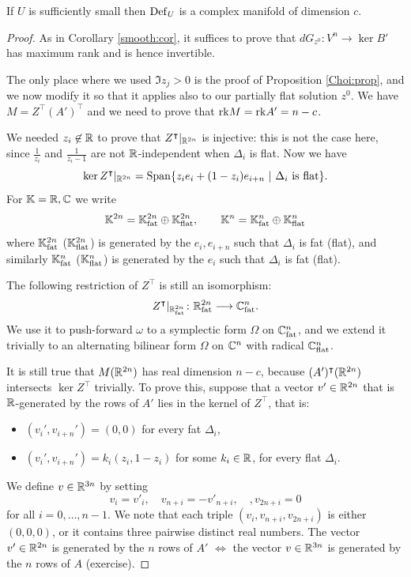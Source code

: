 \begin{prop} \label{smooth:flat:prop}
If $U$ is sufficiently small then ${\rm Def}_U$ is a complex manifold of dimension $c$.
\end{prop}
\begin{proof}
As in Corollary \ref{smooth:cor}, it suffices to prove that $dG_{z^0}\colon V^n \to \ker B'$ has maximum rank and is hence invertible.

The only place where we used $\Im z_j >0$ is the proof of Proposition \ref{Choi:prop}, and we now modify it so that it applies also to our partially flat solution $z^0$. We have $M = Z^\intercal (A')^\intercal$ and we need to prove that ${\rm rk} M = {\rm rk} A' = n-c$.

We needed $z_i \not \in \mathbb{R}$ to prove that $Z^\intercal|_{\mathbb{R}^{2n}}$ is injective: this is not the case here, since $\frac 1{z_i}$ and $\frac 1{z_i-1}$ are not $\mathbb{R}$-independent when $\Delta_i$ is flat. Now we have
$$\ker Z^\intercal |_{\matR^{2n}} = \Span \{ z_ie_i +(1-z_i)e_{i+n}\ | \ \Delta_i\ {\rm is\ flat} \}.$$
For $\mathbb{K}=\mathbb{R}, \mathbb{C}$ we write 
$$\mathbb{K}^{2n} = \mathbb{K}^{2n}_{\rm fat} \oplus \mathbb{K}^{2n}_{\rm flat}, \qquad \mathbb{K}^n = \mathbb{K}^n_{\rm fat} \oplus \mathbb{K}^n_{\rm flat}$$
where $\mathbb{K}^{2n}_{\rm fat}$ ($\mathbb{K}^{2n}_{\rm flat}$) is generated by the $e_i, e_{i+n}$ such that $\Delta_i$ is fat (flat), and similarly $\mathbb{K}^{n}_{\rm fat}$ ($\mathbb{K}^{n}_{\rm flat}$) is generated by the $e_i$ such that $\Delta_i$ is fat (flat).

The following restriction of $Z^\intercal$ is still an isomorphism:
$$Z^\intercal|_{\mathbb{R}^{2n}_{\rm fat}}\colon \mathbb{R}^{2n}_{\rm fat}
\longrightarrow \mathbb{C}^n_{\rm fat}.$$
We use it to push-forward $\omega$ to a symplectic form $\Omega$ on $\mathbb{C}^n_{\rm fat}$, and we extend it trivially to an alternating bilinear form $\Omega$ on $\mathbb{C}^n$ with radical $\mathbb{C}^n_{\rm flat}$.

It is still true that $M(\mathbb{R}^{2n})$ has real dimension $n-c$, because $(A')^\intercal(\mathbb{R}^{2n})$ intersects $\ker Z^\intercal$ trivially. To prove this, suppose that a vector $v'\in\mathbb{R}^{2n}$ that is $\mathbb{R}$-generated by the rows of $A'$ lies in the kernel of $Z^\intercal$, that is:
\begin{itemize}
\item $(v_i', v_{i+n}')=(0,0)$ for every fat $\Delta_i$,
\item $(v_i',v_{i+n}') = k_i(z_i, 1-z_i)$ for some $k_i \in \mathbb{R}$, for every flat $\Delta_i$. 
\end{itemize}
We define $v \in \mathbb{R}^{3n}$ by setting
$$v_i = v'_i, \quad v_{n+i} = - v'_{n+i}, \quad, v_{2n+i} = 0$$
for all $i=0,\ldots, n-1$. We note that each triple $(v_i, v_{n+i}, v_{2n+i})$ is either $(0,0,0)$, or it contains three pairwise distinct real numbers. The vector $v' \in\mathbb{R}^{2n}$ is generated by the $n$ rows of $A'$ $\Longleftrightarrow$ the vector $v\in\mathbb{R}^{3n}$ is generated by the $n$ rows of $A$ (exercise). 


\end{proof}
